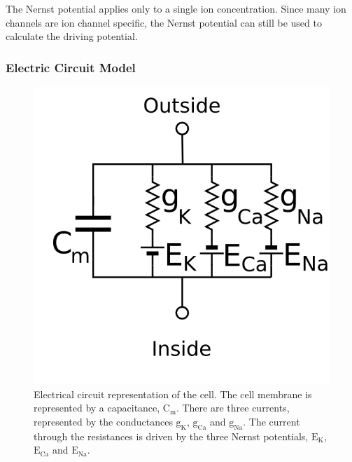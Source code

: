 The Nernst potential applies only to a single ion concentration.
Since many ion channels are ion channel specific, the Nernst potential can still
be used to calculate the driving potential.

\subsubsection{Electric Circuit Model}

\begin{figure}
\begin{center}
\includegraphics{figures/intro/electrical_circuit_cell}
\end{center}
\caption[Electrical Circuit Model Of The Cell]{
\label{fig:intro:math:circuit}
Electrical circuit representation of the cell.
The cell membrane is represented by a capacitance, $\text{C}_{\text{m}}$.
There are three currents, represented by the conductances $\text{g}_{\text{K}}$,
$\text{g}_{\text{Ca}}$ and $\text{g}_{\text{Na}}$.
The current through the resistances is driven by the three Nernst potentials,
$\text{E}_{\text{K}}$, 
$\text{E}_{\text{Ca}}$ and $\text{E}_{\text{Na}}$.
}
\end{figure}

